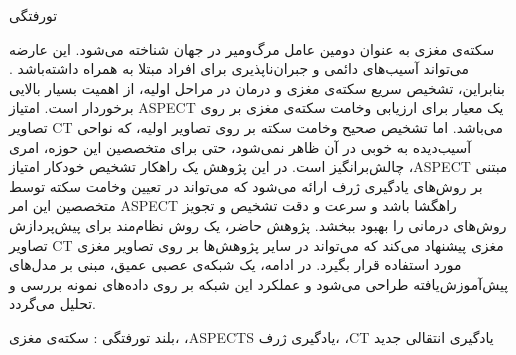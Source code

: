 


‌تورفتگی

سکته‌ی مغزی به عنوان دومین عامل مرگ‌و‌میر در جهان شناخته می‌شود.
این عارضه می‌تواند آسیب‌های دائمی و جبران‌ناپذیری برای افراد مبتلا به همراه داشته‌باشد \cite{donkor2018stroke}.
بنابراین،
تشخیص سریع سکته‌ی مغزی و درمان در مراحل اولیه، از اهمیت بسیار بالایی برخوردار است.
امتیاز ASPECT یک معیار برای ارزیابی وخامت سکته‌ی مغزی بر روی تصاویر CT می‌باشد.
اما تشخیص صحیح وخامت سکته بر روی تصاویر اولیه، که نواحی آسیب‌دیده به خوبی در آن ظاهر نمی‌شود، حتی برای متخصصین این حوزه، امری چالش‌بر‌انگیز است.
 در این پژوهش 
یک راهکار تشخیص خودکار امتیاز ،ASPECT مبتنی بر روش‌های یادگیری ژرف ارائه می‌شود که می‌تواند
 در تعیین وخامت سکته توسط متخصصین این امر ASPECT راهگشا باشد و سرعت و دقت تشخیص و تجویز روش‌های درمانی را بهبود ببخشد.
پژوهش حاضر، یک روش نظام‌مند برای پیش‌پردازش تصاویر CT مغزی پیشنهاد می‌کند که می‌تواند در سایر پژوهش‌ها بر روی تصاویر مغزی مورد استفاده قرار بگیرد.
در ادامه، یک شبکه‌ی عصبی عمیق، مبنی بر مدل‌های پیش‌آموزش‌یافته طراحی می‌شود و  عملکرد این شبکه بر روی داده‌های نمونه بررسی و تحلیل می‌گردد.

‌بلند
‌تورفتگی : 
سکته‌ی مغزی، ،ASPECTS یادگیری ژرف، ،CT یادگیری انتقالی
‌جدید
